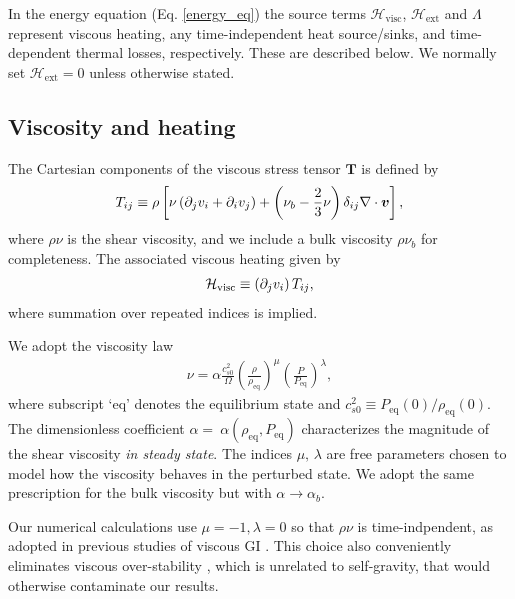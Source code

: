 In the energy equation (Eq. \ref{energy_eq}) the source terms 
$\mathcal{H}_\mathrm{visc}$, $\mathcal{H}_\mathrm{ext}$ and $\Lambda$
represent viscous heating, any time-independent heat
source/sinks, and time-dependent thermal losses, respectively. These
are described below. We normally set
$\mathcal{H}_\mathrm{ext}=0$ unless otherwise stated. 

\subsection{Viscosity and heating}\label{visc_model}
The Cartesian components of the viscous stress tensor $\bm{T}$ is
defined by 
\begin{align}
  T_{ij} \equiv \rho \left[\nu \left(\partial_j v_i + \partial_i v_j\right) +
    \left(\nu_b-\frac{2}{3}\nu\right)\delta_{ij}\nabla\cdot\bm{v}\right], 
\end{align}
where $\rho\nu$ is the shear viscosity, and we include a bulk
viscosity $\rho\nu_b$ for completeness.  
The associated viscous heating given by
\begin{align}
  \mathcal{H}_\mathrm{visc} \equiv \left(\partial_jv_i\right)T_{ij}, 
\end{align}
where summation over repeated indices is implied. 

We adopt the viscosity law  
\begin{align}\label{visc_law}
  \nu = \alpha
  \frac{c_{s0}^2}{\Omega}\left(\frac{\rho}{\rho_\mathrm{eq}}\right)^\mu\left(\frac{P}{P_\mathrm{eq}}\right)^\lambda,            
\end{align}
where subscript `eq' denotes the equilibrium state and  
$c_{s0}^2\equiv P_\mathrm{eq}(0)/\rho_\mathrm{eq}(0)$. 
The dimensionless coefficient
$\alpha=~\alpha(\rho_\mathrm{eq},P_\mathrm{eq})$ characterizes the
magnitude of the shear viscosity \emph{in steady state}. The indices
$\mu,\,\lambda$ are free parameters chosen to model how the viscosity
behaves in the perturbed state.  
We adopt the same prescription for the bulk viscosity but
with $\alpha\to\alpha_b$.   

Our numerical calculations use $\mu=-1,\lambda=0$ so 
that $\rho\nu$ is time-indpendent, as adopted in previous 
studies of viscous GI 
\citep{lynden-bell74,hunter83,willerding92,gammie96}.  
This choice also conveniently eliminates viscous over-stability
\citep{schmit95,latter06}, which is unrelated to self-gravity, that
would otherwise contaminate our results. %

